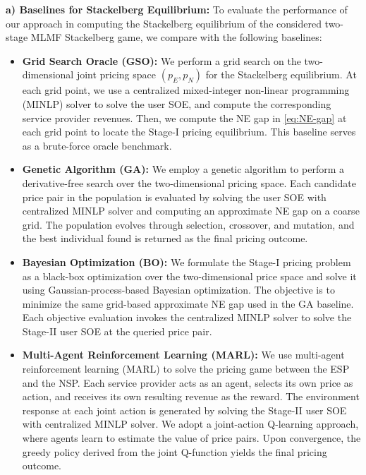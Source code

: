 \documentclass[lettersize,journal]{IEEEtran}
\begin{document}
\textbf{a) Baselines for Stackelberg Equilibrium:}
To evaluate the performance of our approach in computing the Stackelberg equilibrium of the considered two-stage MLMF Stackelberg game, we compare with the following baselines:
\begin{itemize}
    \item \textbf{Grid Search Oracle (GSO):} We perform a grid search on the two-dimensional joint pricing space $(p_E, p_N)$ for the Stackelberg equilibrium. At each grid point, we use a centralized mixed-integer non-linear programming (MINLP) solver to solve the user SOE, and compute the corresponding service provider revenues. Then, we compute the NE gap in \eqref{eq:NE-gap} at each grid point to locate the Stage-I pricing equilibrium. This baseline serves as a brute-force oracle benchmark.

    \item \textbf{Genetic Algorithm (GA):} We employ a genetic algorithm to perform a derivative-free search over the two-dimensional pricing space. Each candidate price pair in the population is evaluated by solving the user SOE with centralized MINLP solver and computing an approximate NE gap on a coarse grid. The population evolves through selection, crossover, and mutation, and the best individual found is returned as the final pricing outcome.

    \item \textbf{Bayesian Optimization (BO):} We formulate the Stage-I pricing problem as a black-box optimization over the two-dimensional price space and solve it using Gaussian-process-based Bayesian optimization. The objective is to minimize the same grid-based approximate NE gap used in the GA baseline. Each objective evaluation invokes the centralized MINLP solver to solve the Stage-II user SOE at the queried price pair.
    
    \item \textbf{Multi-Agent Reinforcement Learning (MARL):} We use multi-agent reinforcement learning (MARL) to solve the pricing game between the ESP and the NSP. Each service provider acts as an agent, selects its own price as action, and receives its own resulting revenue as the reward. The environment response at each joint action is generated by solving the Stage-II user SOE with centralized MINLP solver. We adopt a joint-action Q-learning approach, where agents learn to estimate the value of price pairs. Upon convergence, the greedy policy derived from the joint Q-function yields the final pricing outcome.

\end{itemize}
\end{document}
